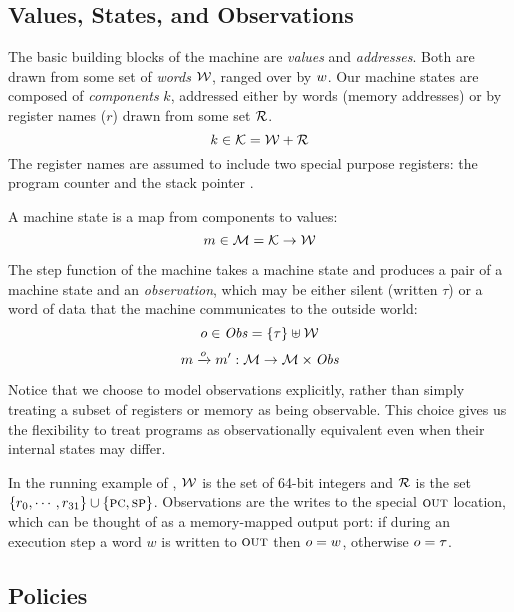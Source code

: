 \documentclass[acmsmall,review,anonymous]{acmart}\settopmatter{printfolios=true,printccs=false,printacmref=false}
\begin{document}
\subsection{Values, States, and Observations}

The basic building blocks of the machine are {\em values} and {\em
  addresses}. Both are drawn from some set of {\em words}
${\mathcal W}$, ranged over by $w$.
%
Our machine states are composed of {\em components} $k$, addressed either by
words (memory addresses) or by register names ($r$) drawn from some set
${\mathcal R}$.
%
    \[k \in {\mathcal K} = {\mathcal W} + {\mathcal R} \]
%
The register names are assumed to include two special purpose registers: the
program counter {\PCname} and the stack pointer \SP.

A machine state is a map from components to values:
%
\[m \in {\mathcal M} = {\mathcal K} \rightarrow {\mathcal W}\]

The step function of the machine takes a machine state and produces a
pair of a machine state and an {\em observation}, which may be either
silent (written $\tau$) or a word of data that the machine
communicates to the outside world:
%
\[o \in \mathit{Obs} = \{\tau\} \uplus {\mathcal W}\]
\[m \xrightarrow{o} m' : {\mathcal M} \rightarrow {\mathcal M} \times \mathit{Obs} \]
%

Notice that we choose to model observations explicitly, rather than simply treating
a subset of registers or memory as being observable.  This choice gives
us the flexibility to treat programs as observationally equivalent even when
their internal states may differ.

In the running example of ,
${\mathcal W}$ is the
set of 64-bit integers and ${\mathcal R}$ is the set $\{r_0, \cdots, r_{31}\}
\cup \{\textsc{pc},\textsc{sp}\}$. Observations are the writes to the
  special $\textsc{out}$ location, which can be thought of as a memory-mapped
  output port: if during an execution step a word $w$ is
written to $\textsc{out}$ then $o = w$, otherwise $o = \tau$.

\subsection{Policies}
\end{document}

